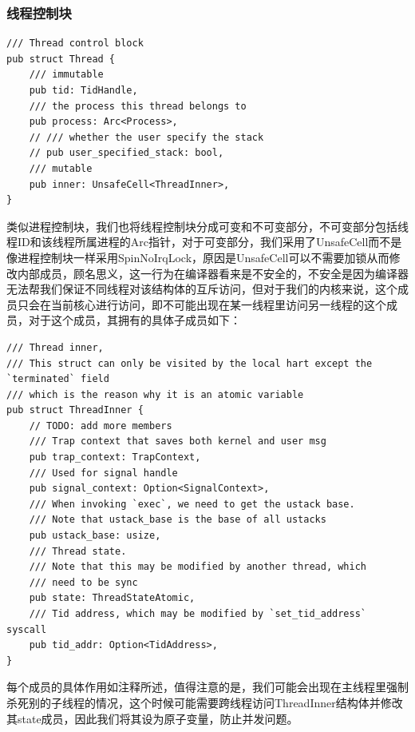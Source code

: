 \subsubsection{线程控制块}
\begin{tcolorbox}[title=\textbf{os/src/process/thread/mod.rs}]
\begin{verbatim}
/// Thread control block
pub struct Thread {
    /// immutable
    pub tid: TidHandle,
    /// the process this thread belongs to
    pub process: Arc<Process>,
    // /// whether the user specify the stack
    // pub user_specified_stack: bool,
    /// mutable
    pub inner: UnsafeCell<ThreadInner>,
}
\end{verbatim}
\end{tcolorbox}
类似进程控制块，我们也将线程控制块分成可变和不可变部分，不可变部分包括线程ID和该线程所属进程的Arc指针，对于可变部分，我们采用了UnsafeCell而不是像进程控制块一样采用SpinNoIrqLock，原因是UnsafeCell可以不需要加锁从而修改内部成员，顾名思义，这一行为在编译器看来是不安全的，不安全是因为编译器无法帮我们保证不同线程对该结构体的互斥访问，但对于我们的内核来说，这个成员只会在当前核心进行访问，即不可能出现在某一线程里访问另一线程的这个成员，对于这个成员，其拥有的具体子成员如下：
\begin{tcolorbox}[title=\textbf{os/src/process/thread/mod.rs}]
\begin{verbatim}
/// Thread inner,
/// This struct can only be visited by the local hart except the `terminated` field
/// which is the reason why it is an atomic variable
pub struct ThreadInner {
    // TODO: add more members
    /// Trap context that saves both kernel and user msg
    pub trap_context: TrapContext,
    /// Used for signal handle
    pub signal_context: Option<SignalContext>,
    /// When invoking `exec`, we need to get the ustack base.
    /// Note that ustack_base is the base of all ustacks
    pub ustack_base: usize,
    /// Thread state.
    /// Note that this may be modified by another thread, which
    /// need to be sync
    pub state: ThreadStateAtomic,
    /// Tid address, which may be modified by `set_tid_address` syscall
    pub tid_addr: Option<TidAddress>,
}
\end{verbatim}
\end{tcolorbox}
每个成员的具体作用如注释所述，值得注意的是，我们可能会出现在主线程里强制杀死别的子线程的情况，这个时候可能需要跨线程访问ThreadInner结构体并修改其state成员，因此我们将其设为原子变量，防止并发问题。

